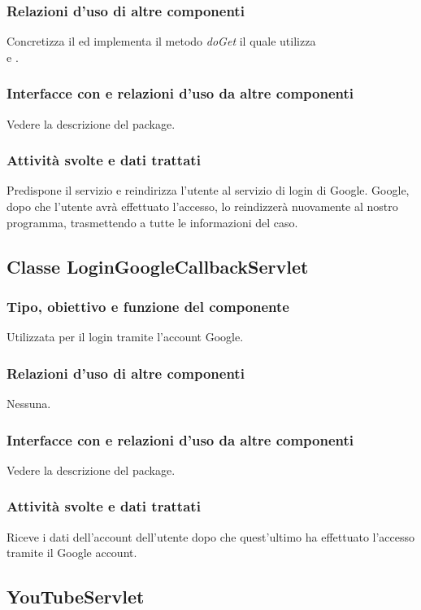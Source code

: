 \subsubsection*{Relazioni d'uso di altre componenti}
Concretizza il  ed implementa il metodo \emph{doGet} il
quale utilizza \\ e .

\subsubsection*{Interfacce con e relazioni d'uso da altre componenti}
Vedere la descrizione del package.
\subsubsection*{Attivit\`a svolte e dati trattati}
Predispone il servizio e reindirizza l'utente al servizio di login di Google.
Google, dopo che l'utente avr\`a effettuato l'accesso, lo reindizzer\`a nuovamente
al nostro programma, trasmettendo a  tutte le
informazioni del caso.


\subsection{Classe LoginGoogleCallbackServlet}
\subsubsection*{Tipo, obiettivo e funzione del componente}
Utilizzata per il login tramite l'account Google.
\subsubsection*{Relazioni d'uso di altre componenti}
Nessuna.
\subsubsection*{Interfacce con e relazioni d'uso da altre componenti}
Vedere la descrizione del package.
\subsubsection*{Attivit\`a svolte e dati trattati}
Riceve i dati dell'account dell'utente dopo che quest'ultimo ha effettuato
l'accesso tramite il Google account.

\subsection{YouTubeServlet} %
